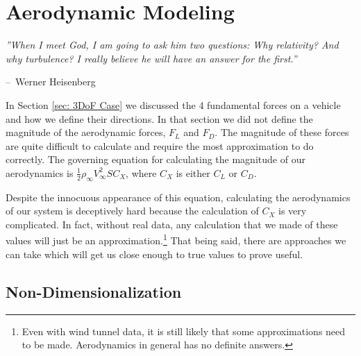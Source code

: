\documentclass[12pt]{report}
\makeatletter
\newenvironment{chapquote}[2][2em]
  {\setlength{\@tempdima}{#1}%
   \def\chapquote@author{#2}%
   \parshape 1 \@tempdima \dimexpr\textwidth-2\@tempdima\relax%
   \itshape}
  {\par\normalfont\hfill--\ \chapquote@author\hspace*{\@tempdima}\par\bigskip}
\makeatother
\begin{document}
{\chapter{Aerodynamic Modeling}\label{sec: aerodynamics}
\begin{chapquote}{Werner Heisenberg}
''When I meet God, I am going to ask him two questions: Why relativity? And why turbulence? I really believe he will have an answer for the first.''
\end{chapquote}
In Section \ref{sec: 3DoF Case} we discussed the 4 fundamental forces on a vehicle and how we define their directions. In that section we did not define the magnitude of the aerodynamic forces, $F_L$ and $F_D$. The magnitude of these forces are quite difficult to calculate and require the most approximation to do correctly. The governing equation for calculating the magnitude of our aerodynamics is $\frac{1}{2}\rho_{\infty}V^2_{\infty}SC_X$, where $C_X$ is either $C_L$ or $C_D$.

Despite the innocuous appearance of this equation, calculating the aerodynamics of our system is deceptively hard because the calculation of $C_X$ is very complicated. In fact, without real data, any calculation that we made of these values will just be an approximation.\footnote{Even with wind tunnel data, it is still likely that some approximations need to be made. Aerodynamics in general has no definite answers.} That being said, there are approaches we can take which will get us close enough to true values to prove useful.

\section{Non-Dimensionalization}

}
\end{document}
